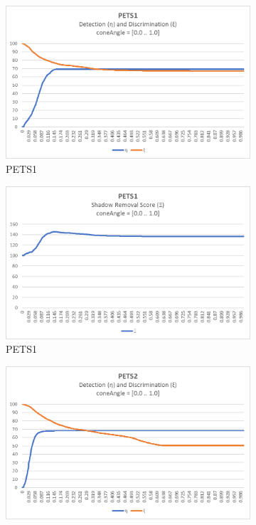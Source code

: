 \begin{appendices}
\clearpage
\FloatBarrier
\begin{figure}
  \begin{subfigure}{.45\linewidth}
  \includegraphics[width=1\linewidth]{figures/appendix/pets1_coneAngle_response.jpg}
  \caption{PETS1}
\end{subfigure}
\hfill
\begin{subfigure}{.45\linewidth}
  \includegraphics[width=1\linewidth]{figures/appendix/pets1_coneAngle_score.jpg}
  \caption{PETS1}
\end{subfigure}
\hfill
\begin{subfigure}{.45\linewidth}
  \includegraphics[width=1\linewidth]{figures/appendix/pets2_coneAngle_response.jpg}

\end{subfigure}
\end{figure}
\end{appendices}
